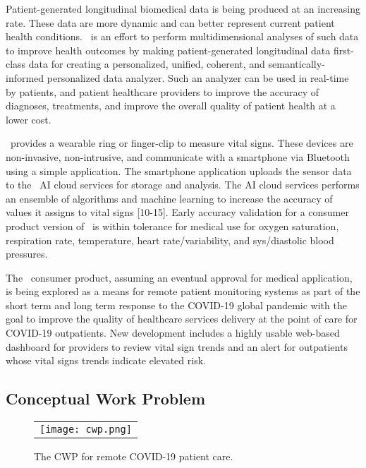 Patient-generated longitudinal biomedical data is being produced at an increasing rate. These data are more dynamic and can better represent current patient health conditions. \phware\ is an effort to perform multidimensional analyses of such data to improve health outcomes by making patient-generated longitudinal data first-class data for creating a personalized, unified, coherent, and semantically-informed personalized data analyzer. Such an analyzer can be used in real-time by patients, and patient healthcare providers to improve the accuracy of diagnoses, treatments, and improve the overall quality of patient health at a lower cost.

\phware\ provides a wearable ring or finger-clip to measure vital signs. These devices are non-invasive, non-intrusive, and  communicate with a smartphone via Bluetooth using a simple application. The smartphone application uploads the sensor data to the \phware\ AI cloud services for storage and analysis. The AI cloud services performs an ensemble of algorithms and machine learning to increase the accuracy of values it assigns to vital signs [10-15]. Early accuracy validation for a consumer product version of \phware\ is within tolerance for medical use for oxygen saturation, respiration rate, temperature, heart rate/variability, and sys/diastolic blood pressures.

The \phware\ consumer product, assuming an eventual approval for medical application, is being explored as a means for remote patient monitoring systems as part of the short term and long term response to the COVID-19 global pandemic with the goal to improve the quality of healthcare services delivery at the point of care for COVID-19 outpatients. New development includes a highly usable web-based dashboard for providers to review vital sign trends and an alert for outpatients whose vital signs trends indicate elevated risk. 

\subsection{Conceptual Work Problem}
\begin{figure*}
  \begin{center}
    \begin{tabular}{c}
      \texttt{[image: cwp.png]}
    \end{tabular}
  \end{center}
\caption{The CWP for remote COVID-19 patient care.}
\label{fig:cwp}
\end{figure*}

